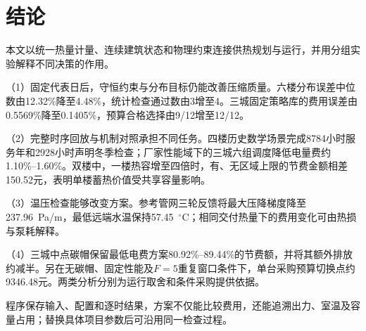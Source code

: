 \section{结论}

本文以统一热量计量、连续建筑状态和物理约束连接供热规划与运行，并用分组实验解释不同决策的作用。

（1）固定代表日后，守恒约束与分布目标仍能改善压缩质量。六楼分布误差中位数由12.32\%降至4.48\%，统计检查通过数由3增至4。三城固定策略库的费用误差由0.5569\%降至0.1405\%，预算合格选择由9/12增至12/12。

（2）完整时序回放与机制对照承担不同任务。四楼历史数学场景完成8784小时服务年和2928小时声明冬季检查；厂家性能域下的三城六组调度降低电量费约1.10\%--1.60\%。双楼中，一楼热容增至四倍时，有、无区域上限的节费金额相差150.52元，表明单楼蓄热价值受共享容量影响。

（3）温压检查能够改变方案。参考管网三轮反馈将最大压降梯度降至237.96~Pa/m，最低远端水温保持57.45~$^\circ$C；相同交付热量下的费用变化可由热损与泵耗解释。

（4）三城中点碳帽保留最低电费方案80.92\%--89.44\%的节费额，并将其额外排放约减半。另在无碳帽、固定性能及$F=5$重复窗口条件下，单台采购预算切换点约9346.48元。两类分析分别为运行取舍和条件采购提供依据。

程序保存输入、配置和逐时结果，方案不仅能比较费用，还能追溯出力、室温及容量占用；替换具体项目参数后可沿用同一检查过程。

